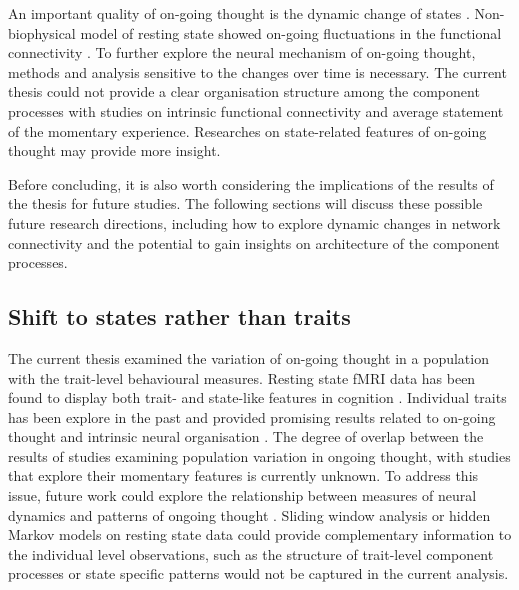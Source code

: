 An important quality of on-going thought is the dynamic change of states \cite{KucyiNI2017}. Non-biophysical model of resting state showed on-going fluctuations in the functional connectivity \cite{Vidaurre2017}. To further explore the neural mechanism of on-going thought, methods and analysis sensitive to the changes over time is necessary. The current thesis could not provide a clear organisation structure among the component processes with studies on intrinsic functional connectivity and average statement of the momentary experience. Researches on state-related features of on-going thought may provide more insight. 
 
Before concluding, it is also worth considering the implications of the results of the thesis for future studies. The following sections will discuss these possible future research directions, including how to explore dynamic changes in network connectivity and the potential to gain insights on architecture of the component processes.

\subsection{Shift to states rather than traits}

The current thesis examined the variation of on-going thought in a population with the trait-level behavioural measures. Resting state fMRI data has been found to display both trait- and state-like features in cognition \cite{Geerligs2015}. Individual traits has been explore in the past and provided promising results related to on-going thought \cite{Smallwood2016,McVay2009,RubyPlos2013} and intrinsic neural organisation \cite{Smith2015}. The degree of overlap between the results of studies examining population variation in ongoing thought, with studies that explore their momentary features is currently unknown. To address this issue, future work could explore the relationship between measures of neural dynamics and patterns of ongoing thought \cite{KucyiNI2017}. Sliding window analysis \cite{Chang2010} or hidden Markov models \cite{Vidaurre2017} on resting state data could provide complementary information to the individual level observations, such as the structure of trait-level component processes or state specific patterns would not be captured in the current analysis.

